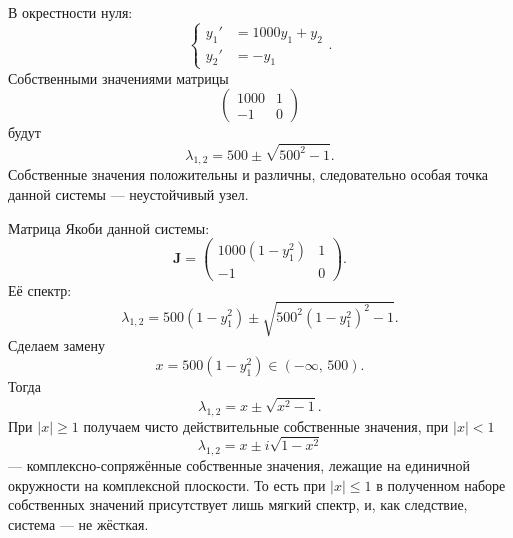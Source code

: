 \documentclass[a4paper]{article}
\begin{document}
\begin{sol}
В окрестности нуля:
	\[
	\left\{
	\begin{aligned}
	y_1'&= 1000y_1+y_2 \\
	y_2'&=-y_1
	\end{aligned}
	\right.
	.\] 
	Собственными значениями матрицы
	\[
		\begin{pmatrix} 1000 &1\\ -1 &0 \end{pmatrix} 
	\] 
будут
\[
\lambda_{1,2}= 500 \pm \sqrt{500^2-1} 
.\] 
Собственные значения положительны и различны, следовательно
особая точка данной системы --- неустойчивый узел.

Матрица Якоби данной системы:
\[
	\mathbf{J}= \begin{pmatrix}1000\left(1-y_1^2\right) & 1\\ -1&0  \end{pmatrix} 
.\] 
Её спектр:
\[
	\lambda_{1,2}=500(1-y_1^2)\pm \sqrt{500^2(1-y_1^2)^2-1} 
.\] 
Сделаем замену
\[
	x=500(1-y_1^2) \in (-\infty,\,500)
.\] 
Тогда
\[
\lambda_{1,2}=x\pm \sqrt{x^2-1} 
.\] 
При $|x|\ge 1$ получаем чисто действительные собственные значения,
при $|x|<1$ 
\[
\lambda_{1,2}=x\pm i \sqrt{1-x^2} 
\] 
--- комплексно-сопряжённые собственные значения, лежащие на единичной
окружности на комплексной плоскости. То есть при $|x|\le 1$
в полученном наборе собственных значений присутствует лишь
мягкий спектр, и, как следствие, система --- не жёсткая.


\end{sol}
\end{document}
